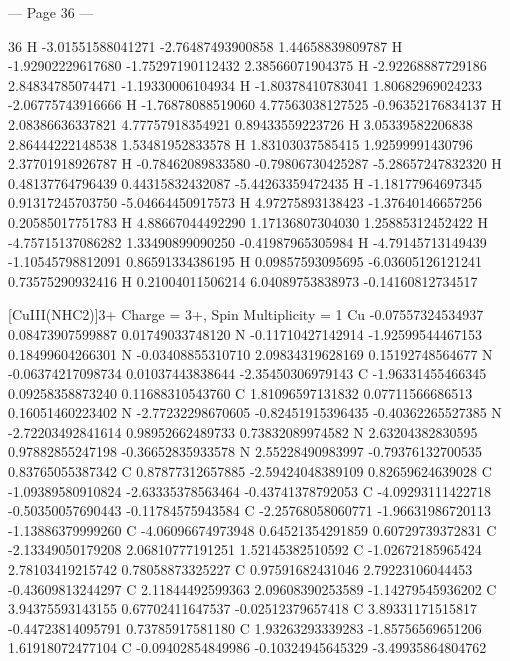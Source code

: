 --- Page 36 ---
 
36 
  H   -3.01551588041271     -2.76487493900858      1.44658839809787 
  H   -1.92902229617680     -1.75297190112432      2.38566071904375 
  H   -2.92268887729186      2.84834785074471     -1.19330006104934 
  H   -1.80378410783041      1.80682969024233     -2.06775743916666 
  H   -1.76878088519060      4.77563038127525     -0.96352176834137 
  H   2.08386636337821      4.77757918354921      0.89433559223726 
  H   3.05339582206838      2.86444222148538      1.53481952833578 
  H   1.83103037585415      1.92599991430796      2.37701918926787 
  H   -0.78462089833580     -0.79806730425287     -5.28657247832320 
  H   0.48137764796439      0.44315832432087     -5.44263359472435 
  H   -1.18177964697345      0.91317245703750     -5.04664450917573 
  H   4.97275893138423     -1.37640146657256      0.20585017751783 
  H   4.88667044492290      1.17136807304030      1.25885312452422 
  H   -4.75715137086282      1.33490899090250     -0.41987965305984 
  H   -4.79145713149439     -1.10545798812091      0.86591334386195 
  H   0.09857593095695     -6.03605126121241      0.73575290932416 
  H   0.21004011506214      6.04089753838973     -0.14160812734517 
 
[CuIII(NHC2)]3+ 
Charge = 3+, Spin Multiplicity = 1 
  Cu  -0.07557324534937      0.08473907599887      0.01749033748120 
  N   -0.11710427142914     -1.92599544467153      0.18499604266301 
  N   -0.03408855310710      2.09834319628169      0.15192748564677 
  N   -0.06374217098734      0.01037443838644     -2.35450306979143 
  C   -1.96331455466345      0.09258358873240      0.11688310543760 
  C   1.81096597131832      0.07711566686513      0.16051460223402 
  N   -2.77232298670605     -0.82451915396435     -0.40362265527385 
  N   -2.72203492841614      0.98952662489733      0.73832089974582 
  N   2.63204382830595      0.97882855247198     -0.36652835933578 
  N   2.55228490983997     -0.79376132700535      0.83765055387342 
  C   0.87877312657885     -2.59424048389109      0.82659624639028 
  C   -1.09389580910824     -2.63335378563464     -0.43741378792053 
  C   -4.09293111422718     -0.50350057690443     -0.11784575943584 
  C   -2.25768058060771     -1.96631986720113     -1.13886379999260 
  C   -4.06096674973948      0.64521354291859      0.60729739372831 
  C   -2.13349050179208      2.06810777191251      1.52145382510592 
  C   -1.02672185965424      2.78103419215742      0.78058873325227 
  C   0.97591682431046      2.79223106044453     -0.43609813244297 
  C   2.11844492599363      2.09608390253589     -1.14279545936202 
  C   3.94375593143155      0.67702411647537     -0.02512379657418 
  C   3.89331171515817     -0.44723814095791      0.73785917581180 
  C   1.93263293339283     -1.85756569651206      1.61918072477104 
  C   -0.09402854849986     -0.10324945645329     -3.49935864804762 


